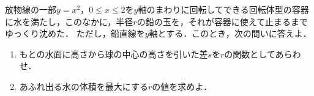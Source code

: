 \documentclass[../../main.tex]{subfiles}
\begin{document}
放物線の一部$y=x^2$，$0\le x\le 2$を$y$軸のまわりに回転してできる回転体型の容器に水を満たし，このなかに，半径$r$の鉛の玉を，それが容器に使えて止まるまでゆっくり沈めた．
ただし，鉛直線を$y$軸とする．このとき，次の問いに答えよ．
\begin{enumerate}
  \item もとの水面に高さから球の中心の高さを引いた差$s$を$r$の関数としてあらわせ．
  \item あふれ出る水の体積を最大にする$r$の値を求めよ．
\end{enumerate}
\end{document}
